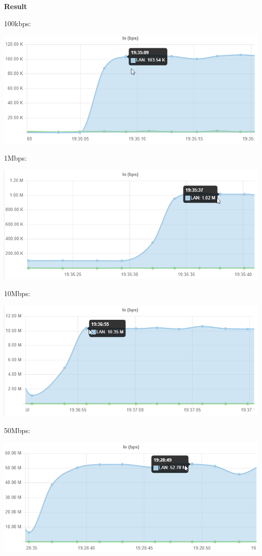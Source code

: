 \documentclass[12pt, a4paper]{article}
\begin{document}
\begin{enumerate}[resume]
    \textbf{Result}

    100kbps:

    \includegraphics[width=0.7\linewidth]{11_100kbps.png}

    1Mbps:

    \includegraphics[width=0.7\linewidth]{11_1Mbps.png}

    \clearpage
    10Mbps:

    \includegraphics[width=0.7\linewidth]{11_10Mbps.png}

    50Mbps:

    \includegraphics[width=0.7\linewidth]{11_50Mbps.png}


\end{enumerate}
\end{document}
